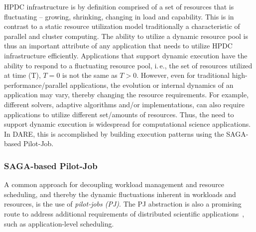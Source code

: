 \documentclass[]{svjour3}
\begin{document}
HPDC infrastructure is by definition comprised of a set of resources
that is fluctuating -- growing, shrinking, changing in load and
capability. This is in contrast to a static resource utilization model
traditionally a characteristic of parallel and cluster computing. The
ability to utilize a dynamic resource pool is thus an important
attribute of any application that needs to utilize HPDC infrastructure
efficiently. Applications that support dynamic execution have the
ability to respond to a fluctuating resource pool, i.\,e., the set of
resources utilized at time (T), $T=0$ is not the same as $T>0$.
However, even for traditional high-performance/parallel applications,
the evolution or internal dynamics of an application may vary, thereby
changing the resource requirements. For example, different solvers,
adaptive algorithms and/or implementations, can also require
applications to utilize different set/amounts of resources. Thus, the
need to support dynamic execution is widespread for computational
science applications. In DARE, this is accomplished by building execution
patterns using the SAGA-based Pilot-Job.


\subsubsection{SAGA-based Pilot-Job}

A common approach for decoupling workload management and resource
scheduling, and thereby the dynamic fluctuations inherent in workloads
and resources, is the use of \emph{pilot-jobs (PJ)}. The PJ
abstraction is also a promising route to address additional
requirements of distributed scientific
applications~\cite{ko-efficient,bigjob_cloudcom10}, such as
application-level scheduling.
 
\end{document}
